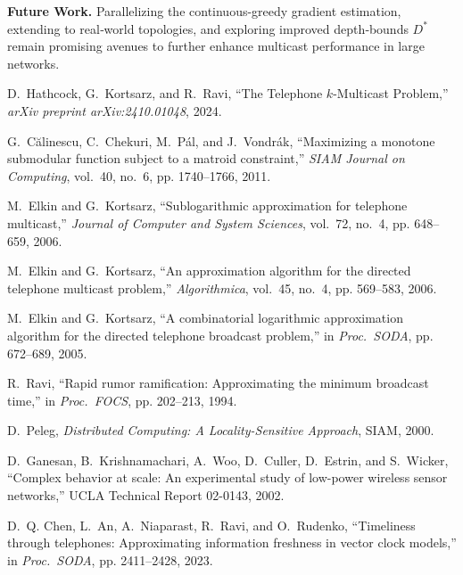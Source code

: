 \documentclass[12pt]{article}
\begin{document}
\noindent\textbf{Future Work.}  
Parallelizing the continuous-greedy gradient estimation, extending to real‐world topologies, and exploring improved depth‐bounds \(D^*\) remain promising avenues to further enhance multicast performance in large networks.

\begin{thebibliography}{10}

D.~Hathcock, G.~Kortsarz, and R.~Ravi,
\newblock ``The Telephone \(k\)-Multicast Problem,''
\newblock \emph{arXiv preprint arXiv:2410.01048}, 2024.

G.~Călinescu, C.~Chekuri, M.~Pál, and J.~Vondrák,
\newblock ``Maximizing a monotone submodular function subject to a matroid constraint,''
\newblock \emph{SIAM Journal on Computing}, vol.~40, no.~6, pp. 1740–1766, 2011.

M.~Elkin and G.~Kortsarz,
\newblock ``Sublogarithmic approximation for telephone multicast,''
\newblock \emph{Journal of Computer and System Sciences}, vol.~72, no.~4, pp. 648–659, 2006.

M.~Elkin and G.~Kortsarz,
\newblock ``An approximation algorithm for the directed telephone multicast problem,''
\newblock \emph{Algorithmica}, vol.~45, no.~4, pp. 569–583, 2006.

M.~Elkin and G.~Kortsarz,
\newblock ``A combinatorial logarithmic approximation algorithm for the directed telephone broadcast problem,''
\newblock in \emph{Proc.\ SODA}, pp. 672–689, 2005.

R.~Ravi,
\newblock ``Rapid rumor ramification: Approximating the minimum broadcast time,''
\newblock in \emph{Proc.\ FOCS}, pp. 202–213, 1994.

D.~Peleg,
\newblock \emph{Distributed Computing: A Locality-Sensitive Approach},
\newblock SIAM, 2000.

D.~Ganesan, B.~Krishnamachari, A.~Woo, D.~Culler, D.~Estrin, and S.~Wicker,
\newblock ``Complex behavior at scale: An experimental study of low-power wireless sensor networks,''
\newblock UCLA Technical Report 02-0143, 2002.

D.~Q. Chen, L.~An, A.~Niaparast, R.~Ravi, and O.~Rudenko,
\newblock ``Timeliness through telephones: Approximating information freshness in vector clock models,''
\newblock in \emph{Proc.\ SODA}, pp. 2411–2428, 2023.

\end{thebibliography}
\end{document}
